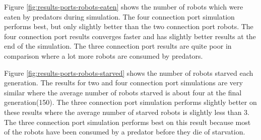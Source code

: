 \vspace*{\fill}
\newpage
\vspace*{\fill}


Figure \ref{fig:results-ports-robots-eaten} shows the number of robots which were eaten by predators during simulation.
The four connection port simulation performs best, but only slightly better than the two connection port robots.
The four connection port results converges faster and has slightly better results at the end of the simulation.
The three connection port results are quite poor in comparison where a lot more robots are consumed by predators.

\vspace*{\fill}
\newpage
\vspace*{\fill}



Figure \ref{fig:results-ports-robots-starved} shows the number of robots starved each generation.
The results for two and four connection port simulations are very similar where the average number of robots starved is about four at the final generation(150).
The three connection port simulation performs slightly better on these results where the average number of starved robots is slightly less than 3.
The three connection port simulation performs best on this result because most of the robots have been consumed by a predator before they die of starvation.

\vspace*{\fill}
\newpage
\vspace*{\fill}



